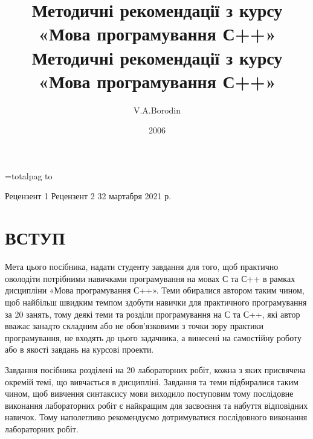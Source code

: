 \documentclass[a5paper,titlepage,openany,twoside,draft]{book_unv}%
\date{}
\begin{document}
\titlepage
\author{V.A.Borodin}
\title{Методичні рекомендації з курсу «Мова програмування С++» }
\date{2006}
\maketitle


=totalpag
 to \totalpag
{}
\title{Методичні рекомендації з курсу «Мова програмування С++» }%
\secondpage%
{\totalpag}
{Рецензент 1}%
{Рецензент 2}%
{32 мартабря 2021 р.}%
\setcounter{page}{2}
\tableofcontents


\chapter*{ ВСТУП }
Мета цього посібника, надати студенту завдання для того, щоб практично
оволодіти потрібними навичками програмування на мовах С та С++ в рамках
дисципліни «Мова програмування С++». Теми обиралися автором таким чином,
щоб найбільш швидким темпом здобути навички для практичного
програмування за 20 занять, тому деякі теми та розділи програмування на
С та С++, які автор вважає занадто складним або не обов'язковими з точки
зору практики програмування, не входять до цього задачника, а винесені
на самостійну роботу або в якості завдань на курсові проекти.

Завдання посібника розділені на 20 лабораторних робіт, кожна з яких
присвячена окремій темі, що вивчається в дисципліні. Завдання та теми
підбиралися таким чином, щоб вивчення синтаксису мови виходило
поступовим тому послідовне виконання лабораторних робіт є найкращим для
засвоєння та набуття відповідних навичок. Тому наполегливо рекомендуємо
дотримуватися послідовного виконання лабораторних робіт.
\end{document}
